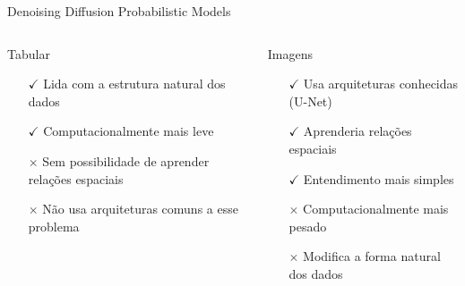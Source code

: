 \begin{frame}[c]{Denoising Diffusion Probabilistic Models}
    \begin{columns}[c]
        \begin{column}{0.46\linewidth}
            \begin{splusbox}{Tabular}
                \begin{itemize}
                    \item[$\checkmark$] Lida com a estrutura natural dos dados
                    \item[$\checkmark$] Computacionalmente mais leve
                    \item[$\times$] Sem possibilidade de aprender relações espaciais
                    \item[$\times$] Não usa arquiteturas comuns a esse problema
                \end{itemize}
            \end{splusbox}
        \end{column}
        \begin{column}{0.46\linewidth}
            \begin{splusbox}{Imagens}
                \begin{itemize}
                    \item[$\checkmark$] Usa arquiteturas conhecidas (U-Net)
                    \item[$\checkmark$] Aprenderia relações espaciais
                    \item[$\checkmark$] Entendimento mais simples
                    \item[$\times$] Computacionalmente mais pesado
                    \item[$\times$] Modifica a forma natural dos dados
                \end{itemize}
            \end{splusbox}
        \end{column}
    \end{columns}
\end{frame}

